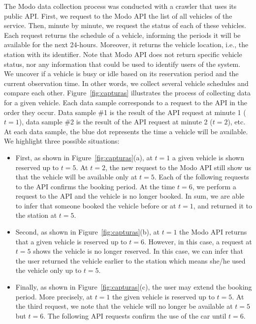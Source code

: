 The Modo data collection process was conducted with a crawler that uses its public API. 
First, we request to the Modo API the list of all vehicles of the service. 
Then, minute by minute, we request the status of each of these vehicles. Each request returns the schedule of a vehicle, informing the periods it will be available for the next 24-hours. Moreover, it returns the vehicle location, i.e., the station with its identifier. 
Note that Modo API does not return specific vehicle status, nor any information that could be used to identify users of the system. We uncover if a vehicle is busy or idle based on its reservation period and the current observation time. In other words, we collect several vehicle schedules and compare each other. Figure~\ref{fig:capturas} illustrates the process of collecting data for a given vehicle. Each data sample corresponds to a request to the API in the order they occur. Data sample \#1 is the result of the API request at minute 1 ($t=1$), data sample \#2 is the result of the API request at minute 2 ($t=2$), etc. At each data sample, the blue dot represents the time a vehicle will be available. We highlight three possible situations:

\begin{itemize}
\item First, as shown in Figure~\ref{fig:capturas}(a), at $t=1$ a given vehicle is shown reserved up to $t=5$.  At $t=2$, the new request to the Modo API still show us that the vehicle will be available only at $t=5$. Each of the following requests to the API confirms the booking period. At the time $t=6$, we perform a request to the API and the vehicle is no longer booked. In sum, we are able to infer that someone booked the vehicle before or at $t=1$, and returned it to the station at $t=5$.

\item Second, as shown in Figure~\ref{fig:capturas}(b), at $t=1$  the Modo API returns that a given vehicle is reserved up to $t=6$.  However, in this case, a request at $t=5$ shows the vehicle is no longer reserved. In this case, we can infer that the user returned the vehicle earlier to the station which means she/he used the vehicle only up to $t=5$.

\item Finally, as shown in Figure~\ref{fig:capturas}(c), the user may extend the booking period. More precisely, at $t=1$ the given vehicle is reserved up to $t=5$. At the third request, we note that the vehicle will no longer be available at $t=5$ but $t=6$. The following API requests confirm the use of the car until $t=6$.
\end{itemize}


